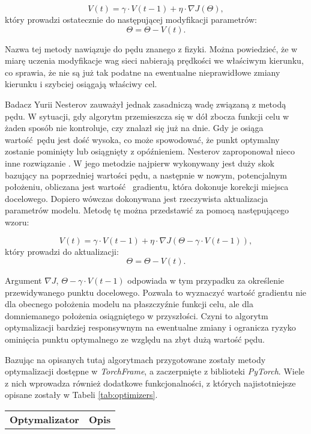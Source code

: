 \begin{enumerate}
    \[V(t)=\gamma \cdot V(t - 1) + \eta \cdot \nabla J(\Theta),\]
    który prowadzi ostatecznie do następującej modyfikacji parametrów:
    \[\Theta = \Theta - V(t).\]

    Nazwa tej metody nawiązuje do pędu znanego z fizyki. Można powiedzieć, że
    w miarę uczenia modyfikacje wag sieci nabierają prędkości we właściwym kierunku, co
    sprawia, że nie są już tak podatne na ewentualne nieprawidłowe zmiany kierunku i
    szybciej osiągają właściwy cel.

    Badacz Yurii Nesterov zauważył jednak zasadniczą wadę związaną z metodą pędu.
    W sytuacji, gdy algorytm przemieszcza się w dół zbocza funkcji celu w żaden
    sposób nie kontroluje, czy znalazł się już na dnie. Gdy je osiąga wartość pędu
    jest dość wysoka, co może spowodować, że punkt optymalny zostanie pominięty
    lub osiągnięty z opóźnieniem. Nesterov zaproponował nieco inne rozwiązanie \cite{Nesterov_momentum}.
    W jego metodzie najpierw wykonywany jest duży skok bazujący na poprzedniej
    wartości pędu, a następnie w nowym, potencjalnym położeniu, obliczana jest wartość 
    gradientu, która dokonuje korekcji miejsca docelowego. Dopiero wówczas dokonywana
    jest rzeczywista aktualizacja parametrów modelu. Metodę tę można przedstawić za
    pomocą następującego wzoru:

    \[V(t)=\gamma \cdot V(t - 1) + \eta \cdot \nabla J(\Theta - \gamma \cdot V(t - 1)),\]
    który prowadzi do aktualizacji:
    \[\Theta = \Theta - V(t).\]

    Argument $\nabla J$, $\Theta - \gamma \cdot V(t - 1)$ odpowiada w tym przypadku za określenie przewidywanego punktu docelowego.
    Pozwala to wyznaczyć wartość gradientu nie dla obecnego położenia modelu na płaszczyźnie
    funkcji celu, ale dla domniemanego położenia osiągniętego w przyszłości. Czyni to
    algorytm optymalizacji bardziej responsywnym na ewentualne zmiany i ogranicza ryzyko
    ominięcia punktu optymalnego ze względu na zbyt dużą wartość pędu.

    Bazując na opisanych tutaj algorytmach przygotowane zostały metody optymalizacji
    dostępne w \textit{TorchFrame}, a zaczerpnięte z biblioteki \textit{PyTorch}. Wiele z nich wprowadza
    również dodatkowe funkcjonalności, z których najistotniejsze opisane zostały w Tabeli \ref{tab:optimizers}.

    \begin{longtable}{ |m{3cm}|m{10cm}| }

     \hline
       \textbf{Optymalizator} & \textbf{Opis} \\


\end{longtable}
\end{enumerate}
